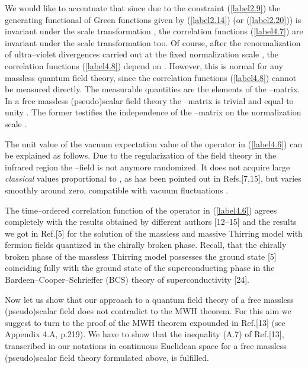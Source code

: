 \documentclass[a4paper,12pt] {article}
\begin{document}
We would like to accentuate that since due to the constraint
(\ref{label2.9}) the generating functional of Green functions \coordHE{}
given by (\ref{label2.14}) (or (\ref{label2.20})) is invariant under
the scale transformation \coordHE{} , the correlation functions
(\ref{label4.7}) are invariant under the scale transformation \coordHE{} too. Of course, after the renormalization of ultra--violet
divergences carried out at the fixed normalization scale \coordHE{}, the
correlation functions (\ref{label4.8}) depend on \coordHE{}. However, this is
normal for any massless quantum field theory, since the correlation
functions (\ref{label4.8}) cannot be measured directly. The measurable
quantities are the elements of the \coordHE{}--matrix. In a free massless
(pseudo)scalar field theory the \coordHE{}--matrix is trivial and equal to
unity \coordHE{}. The former testifies the independence of the
\coordHE{}--matrix on the normalization scale \coordHE{}.

The unit value of the vacuum expectation value of the operator
\coordHE{} in (\ref{label4.6}) can be
explained as follows. Due to the regularization of the field theory in
the infrared region the \myHighlight{$\vartheta$}\coordHE{}--field is not anymore randomized.
It does not acquire large {\it classical} values proportional to
\myHighlight{$2\pi$}\coordHE{}, as has been pointed out in Refs.[7,15], but varies smoothly
around zero, compatible with vacuum fluctuations \coordHE{}.

The time--ordered correlation function of the operator \coordHE{} in (\ref{label4.6})
agrees completely with the results obtained by different authors
[12--15] and the results we got in Ref.[5] for the solution of the
massless and massive Thirring model with fermion fields quantized in
the chirally broken phase. Recall, that the chirally broken phase of
the massless Thirring model possesses the ground state [5] coinciding
fully with the ground state of the superconducting phase in the
Bardeen--Cooper--Schrieffer (BCS) theory of superconductivity [24].

Now let us show that our approach to a quantum field theory of a free
massless (pseudo)scalar field \coordHE{} does not contradict to
the MWH theorem. For this aim we suggest to turn to the proof of the
MWH theorem expounded in Ref.[13] (see Appendix 4.A, p.219). We have
to show that the inequality (A.7) of Ref.[13], transcribed in our
notations in continuous Euclidean space for a free massless
(pseudo)scalar field theory formulated above, is fulfilled.
\end{document}
